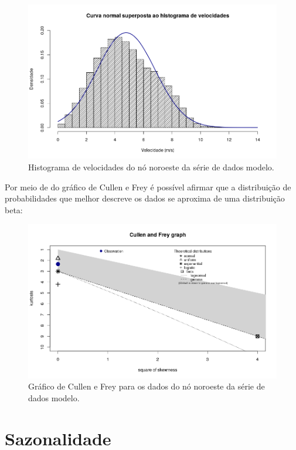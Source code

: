 \documentclass[
	12pt,				%
	openright,			%
	oneside,			%
	a4paper,			%
	english,			%
	french,				%
	spanish,			%
	brazil				%
	]{abntex2}
\begin{document}
\begin{figure}[h]
    \centering
	\includegraphics[width=\textwidth]{normal_overlay}
	\caption{Histograma de velocidades do nó noroeste da série de dados modelo.}
\end{figure}
\FloatBarrier

Por meio de do gráfico de Cullen e Frey é possível afirmar que a distribuição de probabilidades que melhor descreve os dados se aproxima de uma distribuição beta:

\begin{figure}[h]
    \centering
	\includegraphics[width=\textwidth]{cullen}
	\caption{Gráfico de Cullen e Frey para os dados do nó noroeste da série de dados modelo.}
\end{figure}
\FloatBarrier

\section{Sazonalidade}
\end{document}
